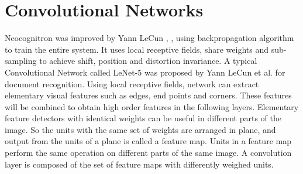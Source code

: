 \documentclass{llncs}
\begin{document}
\section{Convolutional Networks}
\par Neocognitron was improved by  Yann LeCun \cite{lecun-86}, \cite{lecun-89e}, using backpropagation algorithm  to train the entire system. It uses local receptive fields, share weights and  sub-sampling to achieve  shift, position and distortion invariance. A typical Convolutional Network called  LeNet-5 was proposed by   Yann LeCun et al. \cite{LeCun1998}  for document recognition. Using \allowbreak local receptive fields, network can extract elementary visual features such as edges, end points and corners. These features will be combined to obtain high order features in the following layers. Elementary feature detectors with identical weights can be useful in different parts of the image. So the units with  the same set of weights are arranged in plane, and output from  the units of a plane is called  a feature map. Units in  a feature map perform the same operation on different parts of the same image. A convolution layer is composed of the set of feature maps with differently weighed units. 
\end{document}
